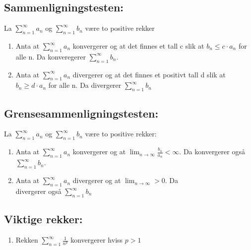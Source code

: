 \documentclass[8pt,a4paper,twocolumn,twoside]{article}
\def\suminfty#1#2{\sum_{n=#1}^\infty #2}
\begin{document}
        \subsection*{Sammenligningstesten:}
        La $\suminfty{1}{a_n}$ og $\suminfty{1}{b_n}$ være to positive rekker
        \begin{enumerate}
            \item Anta at $\suminfty{1}{a_n}$ konvergerer og at det finnes et tall c slik at $b_n \leq c\cdot a_n$ for alle n. Da konveregerer $\suminfty{1}{b_n}$.
            \item Anta at $\suminfty{1}{a_n}$ divergerer og at det finnes et positivt tall d slik at $b_n \geq d\cdot a_n$ for alle n. Da divergerer $\suminfty{1}{b_n}$
        \end{enumerate}
        \subsection*{Grensesammenligningstesten:}
        La $\suminfty{1}{a_n}$ og $\suminfty{1}{b_n}$ være to positive rekker:
        \begin{enumerate}
            \item Anta at $\suminfty{1}{a_n}$ konvergerer og at $\lim_{n\to\infty}\frac{b_n}{a_n}<\infty$. Da konvergerer også $\suminfty{1}{b_n}$.
            \item Anta at $\suminfty{1}{a_n}$ divergerer og at $\lim_{n\to\infty}>0$. Da \\divergerer også $\suminfty{1}{b_n}$
        \end{enumerate}
        \subsection*{Viktige rekker:}
        \begin{enumerate}
            \item Rekken $\sum_{n=1}^\infty \frac{1}{n^p}$ konvergerer hviss $p > 1$ 
        \end{enumerate}
\end{document}
